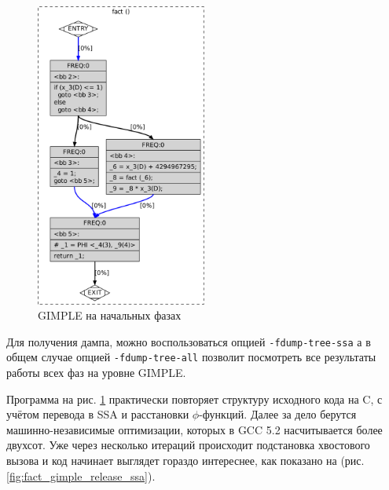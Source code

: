 \documentclass[a4paper,12pt,oneside]{article}
\begin{document}
\begin{figure}[ht]
\centering
\includegraphics[width=0.5\textwidth]{illustrations/fact-ssa-crop.pdf}
\caption{GIMPLE на начальных фазах}
\label{fig:fact_gimple_ssa}
\end{figure}

Для получения дампа, можно воспользоваться опцией \lstinline!-fdump-tree-ssa! а в общем случае опцией \lstinline!-fdump-tree-all! позволит посмотреть все результаты работы всех фаз на уровне GIMPLE.

Программа на рис. \ref{fig:fact_gimple_ssa} практически повторяет структуру исходного кода на C, с учётом перевода в SSA и расстановки $\phi$-функций. Далее за дело берутся машинно-независимые оптимизации, которых в GCC 5.2 насчитывается более двухсот. Уже через несколько итераций происходит подстановка хвостового вызова и код начинает выглядет гораздо интереснее, как показано на (рис. \ref{fig:fact_gimple_release_ssa}).
\end{document}
